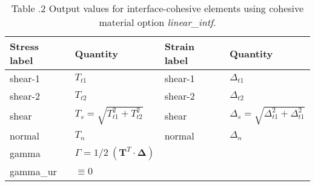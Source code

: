 \documentclass[11pt]{report}
\numberwithin{equation}{section}
\newcommand{\bmf } {\boldsymbol }  %
\newcommand{\ti}{\emph}
\begin{document}
\begin{table}[htb]	
\centering
\small
{
\setlength{\extrarowheight}{4 pt}
\begin{tabular}{ | p{1.0in} | >{\centering\arraybackslash}m{1.5in} | | p{1.0in} | >{\centering\arraybackslash}m{1.5in} |  }
 \hline
  Stress label & Quantity& Strain label& Quantity \\
\hline \hline
\hspace{0.25in}shear-1 & $T_{t1}$& \hspace{0.25in}shear-1 & $\Delta_{t1}$ \\
\hspace{0.25in}shear-2 & $T_{t2}$ & \hspace{0.25in}shear-2 & $\Delta_{t2}$ \\ 
\hspace{0.25in}shear & $T_s = \sqrt{T_{t1}^2 + T_{t2}^2}$ & \hspace{0.25in}shear & $ \Delta_s = \sqrt{\Delta_{t1}^2 + \Delta_{t1}^2}$ \\ 
\hspace{0.25in}normal & $T_n$ & \hspace{0.25in}normal & $\Delta_n$ \\

\hspace{0.25in}gamma &$ \Gamma = 1/2\ ( \bmf{T}^T \cdot \bmf{\Delta})$ &  & \\ 
\hspace{0.25in}gamma\_ur & $\equiv 0$& &  \\ \hline 
\end{tabular}}
%
\begin{minipage}[c]{6in}
\caption{\\ \small Table \thesection.2
Output values for interface-cohesive elements using 
cohesive material option \ti{linear\_intf}.  }
\end{minipage}
\label{table:linear_model_output}
\end{table}
\normalsize
\end{document}
